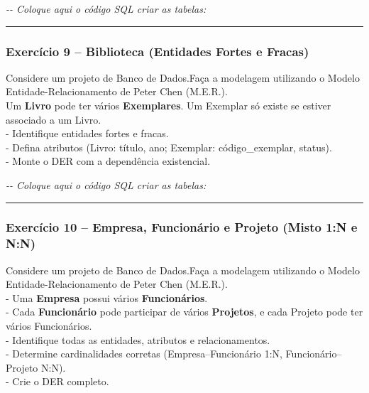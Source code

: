\documentclass[
]{book}
\newenvironment{Shaded}{\begin{snugshade}}{\end{snugshade}}
\newcommand{\CommentTok}[1]{\textcolor[rgb]{0.56,0.35,0.01}{\textit{#1}}}
\begin{document}


\begin{Shaded}
\begin{Highlighting}[]
\CommentTok{{-}{-} Coloque aqui o código SQL criar as tabelas:}


\end{Highlighting}
\end{Shaded}

\begin{center}\rule{0.5\linewidth}{0.5pt}\end{center}

\subsubsection{Exercício 9 -- Biblioteca (Entidades Fortes e Fracas)}\label{exercuxedcio-9-biblioteca-entidades-fortes-e-fracas}

Considere um projeto de Banco de Dados.Faça a modelagem utilizando o Modelo Entidade-Relacionamento de Peter Chen (M.E.R.).\\
Um \textbf{Livro} pode ter vários \textbf{Exemplares}. Um Exemplar só existe se estiver associado a um Livro.\\
- Identifique entidades fortes e fracas.\\
- Defina atributos (Livro: título, ano; Exemplar: código\_exemplar, status).\\
- Monte o DER com a dependência existencial.



\begin{Shaded}
\begin{Highlighting}[]
\CommentTok{{-}{-} Coloque aqui o código SQL criar as tabelas:}


\end{Highlighting}
\end{Shaded}

\begin{center}\rule{0.5\linewidth}{0.5pt}\end{center}

\subsubsection{Exercício 10 -- Empresa, Funcionário e Projeto (Misto 1:N e N:N)}\label{exercuxedcio-10-empresa-funcionuxe1rio-e-projeto-misto-1n-e-nn}

Considere um projeto de Banco de Dados.Faça a modelagem utilizando o Modelo Entidade-Relacionamento de Peter Chen (M.E.R.).\\
- Uma \textbf{Empresa} possui vários \textbf{Funcionários}.\\
- Cada \textbf{Funcionário} pode participar de vários \textbf{Projetos}, e cada Projeto pode ter vários Funcionários.\\
- Identifique todas as entidades, atributos e relacionamentos.\\
- Determine cardinalidades corretas (Empresa--Funcionário 1:N, Funcionário--Projeto N:N).\\
- Crie o DER completo.
\end{document}

